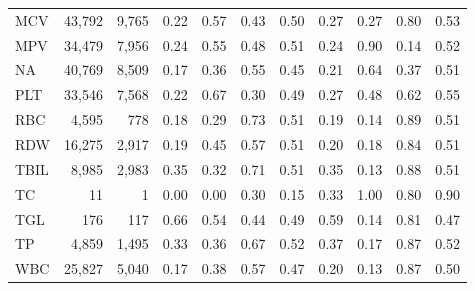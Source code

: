 \begin{table}[ht]
\begin{tabular}{lrrrrrrrrrr}
MCV & 43,792 & 9,765 & 0.22 & 0.57 & 0.43 & 0.50 & 0.27 & 0.27 & 0.80 & 0.53 \\
MPV & 34,479 & 7,956 & 0.24 & 0.55 & 0.48 & 0.51 & 0.24 & 0.90 & 0.14 & 0.52 \\
NA & 40,769 & 8,509 & 0.17 & 0.36 & 0.55 & 0.45 & 0.21 & 0.64 & 0.37 & 0.51 \\
PLT & 33,546 & 7,568 & 0.22 & 0.67 & 0.30 & 0.49 & 0.27 & 0.48 & 0.62 & 0.55 \\
RBC & 4,595 & 778 & 0.18 & 0.29 & 0.73 & 0.51 & 0.19 & 0.14 & 0.89 & 0.51 \\
RDW & 16,275 & 2,917 & 0.19 & 0.45 & 0.57 & 0.51 & 0.20 & 0.18 & 0.84 & 0.51 \\
TBIL & 8,985 & 2,983 & 0.35 & 0.32 & 0.71 & 0.51 & 0.35 & 0.13 & 0.88 & 0.51 \\
TC & 11 & 1 & 0.00 & 0.00 & 0.30 & 0.15 & 0.33 & 1.00 & 0.80 & 0.90 \\
TGL & 176 & 117 & 0.66 & 0.54 & 0.44 & 0.49 & 0.59 & 0.14 & 0.81 & 0.47 \\
TP & 4,859 & 1,495 & 0.33 & 0.36 & 0.67 & 0.52 & 0.37 & 0.17 & 0.87 & 0.52 \\
WBC & 25,827 & 5,040 & 0.17 & 0.38 & 0.57 & 0.47 & 0.20 & 0.13 & 0.87 & 0.50 \\
\bottomrule
\end{tabular}
\label{tab:eicu_eval_prolonged_los}
\end{table}